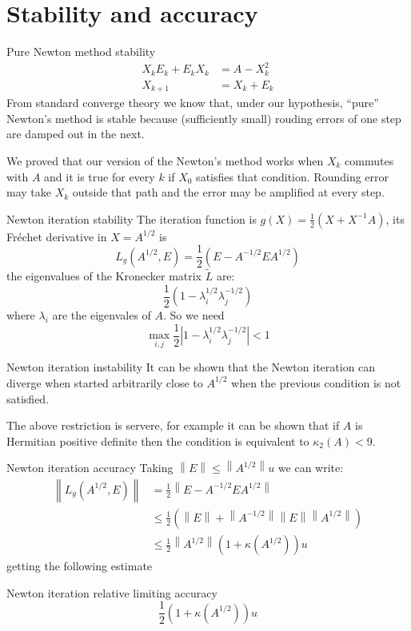 \documentclass{beamer}
\theoremstyle{plain}
\theoremstyle{definition}
\theoremstyle{remark}
\newcommand{\pa}[1]{\left(#1\right)}
\newcommand{\abs}[1]{\left|#1\right|}
\newcommand{\norm}[1]{\left\|#1\right\|}
\begin{document}
\section{Stability and accuracy}

\begin{frame}{Pure Newton method stability}
  \begin{align*}
    X_k E_k + E_k X_k &= A - X_k ^2 \\
    X_{k+1} &= X_k + E_k
  \end{align*}
  From standard converge theory we know that, under our hypothesis,
  ``pure'' Newton's method is stable because (sufficiently small)
  rouding errors of one step are damped out in the next. \vfill

  We proved that our version of the Newton's method works when $X_k$
  commutes with $A$ and it is true for every $k$ if $X_0$ satisfies
  that condition. Rounding error may take $X_k$ outside that path and
  the error may be amplified at every step.
\end{frame}

\begin{frame}{Newton iteration stability}
  The iteration function is $g(X) = \frac{1}{2}\pa{X+ X^{-1}A}$, its
  Fr\'echet derivative in $X=A^{1/2}$ is
  \[ L_g\pa{A^{1/2},E} = \frac{1}{2}\pa{E-A^{-1/2}EA^{1/2}} \]
  the eigenvalues of the Kronecker matrix $\tilde L$ are:
  \[ \frac{1}{2}\pa{1-\lambda _i ^{1/2} \lambda _j^{-1/2}} \]
  where $\lambda _i$ are the eigenvales of $A$. So we need
  \[ \max _{i,j} \frac{1}{2} \abs{ 1- \lambda _i^{1/2} \lambda
      _j^{-1/2}} <1 \]
\end{frame}

\begin{frame}{Newton iteration instability}
  It can be shown that the Newton iteration can diverge when started
  arbitrarily close to $A^{1/2}$ when the previous condition is not
  satisfied. \vfill

  The above restriction is servere, for example it can be shown that
  if $A$ is Hermitian positive definite then the condition is
  equivalent to $\kappa _2 (A) <9$.
\end{frame}

\begin{frame}{Newton iteration accuracy}
  Taking $\norm{E} \le \norm{A^{1/2}} u$ we can write:
  \begin{align*}
    \norm{L_g\pa{A^{1/2},E}} &= \frac{1}{2}\norm{E-A^{-1/2}EA^{1/2}} \\
      &\le \frac{1}{2}\pa{\norm{E} +
        \norm{A^{-1/2}}\norm{E}\norm{A^{1/2}}} \\
    & \le \frac{1}{2}\norm{A^{1/2}}\pa{1+\kappa\pa{A^{1/2}}}u
  \end{align*}
  getting the following estimate
  \begin{block}{Newton iteration relative limiting accuracy}
    \[ \frac{1}{2}\pa{1+\kappa\pa{A^{1/2}}}u \]
  \end{block}
\end{frame}
\end{document}
